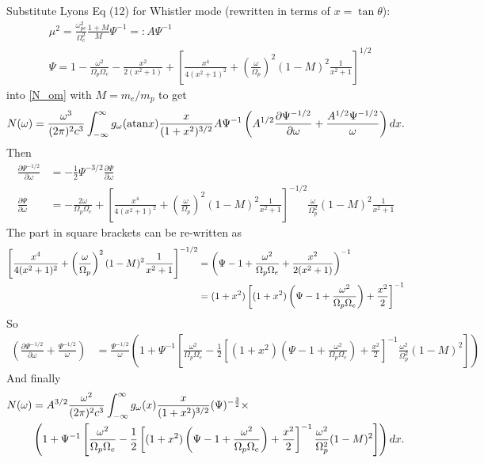 \documentclass[]{article}
\begin{document}
Substitute Lyons Eq (12) for Whistler mode (rewritten in terms of $x = \tan \theta$):
\begin{align}
&\mu^2 = \frac{\omega_{pe}^2}{\Omega_c^2}\frac{1+M}{M} \Psi^{-1} =: A \Psi^{-1}\\
&\Psi = 1 - \frac{\omega^2}{\Omega_p\Omega_e} - \frac{x^2}{2(x^2 + 1)} + \left[\frac{x^4}{4(x^2+1)^2} + \left(\frac{\omega}{\Omega_p}\right)^2(1-M)^2\frac{1}{x^2 +1}\right]^{1/2}
\end{align} into \ref{N_om} with $M = m_e /m_p$
to get
\begin{equation}
N(\omega) = \frac{\omega^3}{(2\pi)^2 c^3} \int_{-\infty}^\infty g_\omega( \mathrm{atan} x ) 
 \frac{x}{(1+x^2)^{3/2}} A \Psi^{-1}
  \left( A^{1/2}\frac{\partial  \Psi^{-1/2}}{\partial \omega} + \frac {A^{1/2}\Psi^{-1/2}}{\omega}\right) d x .
\end{equation} Then
\begin{align}
\frac{\partial \Psi^{-1/2}}{\partial \omega} &= -\frac{1}{2}\Psi^{-3/2} \frac{\partial \Psi}{\partial \omega}\\
 \frac{\partial \Psi}{\partial \omega} &= -\frac{2 \omega}{\Omega_p\Omega_e} + \left[\frac{x^4}{4(x^2+1)^2} + \left(\frac{\omega}{\Omega_p}\right)^2(1-M)^2\frac{1}{x^2 +1}\right]^{-1/2}\frac{\omega}{\Omega_p^2}(1-M)^2 \frac{1}{x^2+1}
 \end{align}
 The part in square brackets can be re-written as 
\begin{align}
 \left[\frac{x^4}{4(x^2+1)^2} + \left(\frac{\omega}{\Omega_p}\right)^2(1-M)^2\frac{1}{x^2 +1}\right]^{-1/2} &= \left( \Psi - 1 + \frac{\omega^2}{\Omega_p\Omega_e} + \frac{x^2}{2(x^2+1)}\right)^{-1}\notag\\
 &=(1+x^2) \left[(1+x^2)\left(\Psi - 1 + \frac{\omega^2}{\Omega_p\Omega_e}\right) + \frac{x^2}{2}\right]^{-1}
\end{align}
So
\begin{align}
\left(\frac{\partial  \Psi^{-1/2}}{\partial \omega} + \frac {\Psi^{-1/2}}{\omega}\right) &= \frac{\Psi^{-1/2}}{\omega} \left( 1 +\Psi^{-1} \left[  \frac{ \omega^2}{\Omega_p\Omega_e} - \frac{1}{2}\left[(1+x^2)\left(\Psi - 1 + \frac{\omega^2}{\Omega_p\Omega_e}\right) + \frac{x^2}{2}\right]^{-1} \frac{\omega^2}{\Omega_p^2}(1-M)^2  \right] \right)
\end{align}
And finally
\begin{align}
N(\omega) &= A^{3/2}\frac{\omega^2}{(2\pi)^2 c^3} \int_{-\infty}^\infty g_\omega( x ) 
 \frac{x}{(1+x^2)^{3/2}} ( \Psi)^{-\frac{3}{2}}\times\notag\\
& \left( 1 +\Psi^{-1} \left[  \frac{ \omega^2}{\Omega_p\Omega_e} - \frac{1}{2}\left[(1+x^2)\left(\Psi - 1 + \frac{\omega^2}{\Omega_p\Omega_e}\right) + \frac{x^2}{2}\right]^{-1} \frac{\omega^2}{\Omega_p^2}(1-M)^2  \right] \right)
d x .
\end{align} 
\end{document}
